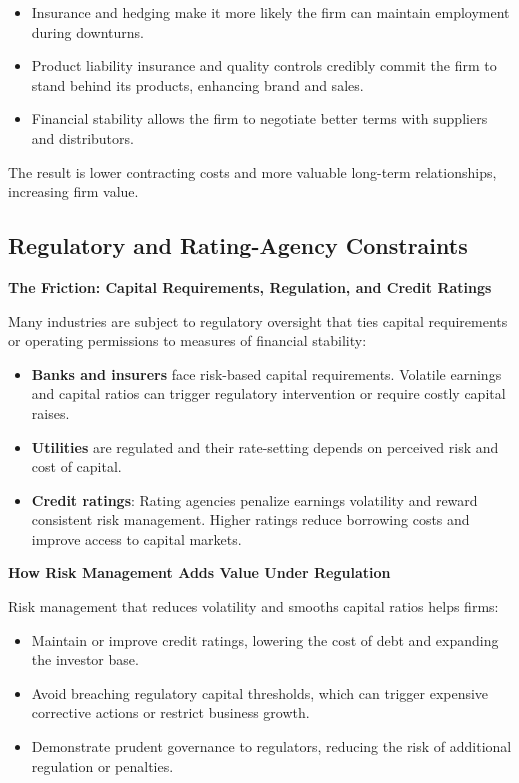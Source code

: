 \documentclass[11pt,openany]{book}
\providecommand{\tightlist}{\setlength{\itemsep}{0pt}\setlength{\parskip}{0pt}}
\begin{document}
\begin{itemize}
\tightlist
\item
  Insurance and hedging make it more likely the firm can maintain employment during downturns.
\item
  Product liability insurance and quality controls credibly commit the firm to stand behind its products, enhancing brand and sales.
\item
  Financial stability allows the firm to negotiate better terms with suppliers and distributors.
\end{itemize}

The result is lower contracting costs and more valuable long-term relationships, increasing firm value.

\subsection{Regulatory and Rating-Agency Constraints}\label{regulatory-and-rating-agency-constraints}

\textbf{The Friction: Capital Requirements, Regulation, and Credit Ratings}

Many industries are subject to regulatory oversight that ties capital requirements or operating permissions to measures of financial stability:

\begin{itemize}
\tightlist
\item
  \textbf{Banks and insurers} face risk-based capital requirements. Volatile earnings and capital ratios can trigger regulatory intervention or require costly capital raises.
\item
  \textbf{Utilities} are regulated and their rate-setting depends on perceived risk and cost of capital.
\item
  \textbf{Credit ratings}: Rating agencies penalize earnings volatility and reward consistent risk management. Higher ratings reduce borrowing costs and improve access to capital markets.
\end{itemize}

\textbf{How Risk Management Adds Value Under Regulation}

Risk management that reduces volatility and smooths capital ratios helps firms:

\begin{itemize}
\tightlist
\item
  Maintain or improve credit ratings, lowering the cost of debt and expanding the investor base.
\item
  Avoid breaching regulatory capital thresholds, which can trigger expensive corrective actions or restrict business growth.
\item
  Demonstrate prudent governance to regulators, reducing the risk of additional regulation or penalties.
\end{itemize}
\end{document}
